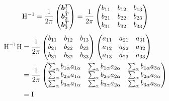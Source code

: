 \documentclass[11pt,a4paper,uplatex]{jsarticle}
\begin{document}
    \begin{align}
    {\rm H}^{-1} &= \frac{1}{2\pi} \begin{pmatrix} \bm{b}_{1}^{T} \\ \bm{b}_{2}^{T} \\ \bm{b}_{3}^{T} \end{pmatrix} 
        = \frac{1}{2\pi}\begin{pmatrix} 
            b_{11} & b_{12} & b_{13} \\
            b_{21} & b_{22} & b_{23} \\
            b_{31} & b_{32} & b_{33} \\
        \end{pmatrix} \\
    \end{align}
    \begin{align}
        {\rm H^{-1} H} &=\frac{1}{2\pi} 
        \begin{pmatrix} 
            b_{11} & b_{12} & b_{13} \\
            b_{21} & b_{22} & b_{23} \\
            b_{31} & b_{32} & b_{33} \\
        \end{pmatrix} 
        \begin{pmatrix} 
            a_{11} & a_{21} & a_{31} \\
            a_{12} & a_{22} & a_{32} \\
            a_{13} & a_{23} & a_{33} \\
        \end{pmatrix} \\
        &=\frac{1}{2\pi} 
        \begin{pmatrix} 
            \sum_{\alpha} b_{1 \alpha} a_{1 \alpha} & \sum_{\alpha} b_{1 \alpha} a_{2 \alpha}  & \sum_{\alpha} b_{1 \alpha} a_{3 \alpha}  \\
            \sum_{\alpha} b_{2 \alpha} a_{1 \alpha} & \sum_{\alpha} b_{2 \alpha} a_{2 \alpha}  & \sum_{\alpha} b_{2 \alpha} a_{3 \alpha}  \\
            \sum_{\alpha} b_{3 \alpha} a_{1 \alpha} & \sum_{\alpha} b_{3 \alpha} a_{2 \alpha}  & \sum_{\alpha} b_{3 \alpha} a_{3 \alpha}  \\
        \end{pmatrix}\\ 
        &= {\rm I}
    \end{align}
    

%
\end{document}
